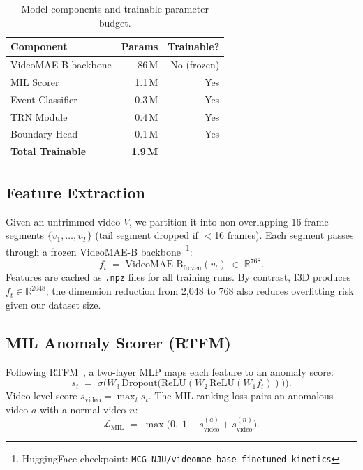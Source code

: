 \documentclass[sigconf,nonacm]{acmart}
\begin{document}
\begin{table}[t]
  \centering
  \caption{Model components and trainable parameter budget.}
  \label{tab:params}
  \small
  \begin{tabular}{lrr}
    \toprule
    \textbf{Component}      & \textbf{Params} & \textbf{Trainable?} \\
    \midrule
    VideoMAE-B backbone     & 86\,M           & No (frozen)         \\
    MIL Scorer              &  1.1\,M         & Yes                 \\
    Event Classifier        &  0.3\,M         & Yes                 \\
    TRN Module              &  0.4\,M         & Yes                 \\
    Boundary Head           &  0.1\,M         & Yes                 \\
    \midrule
    \textbf{Total Trainable} & \textbf{1.9\,M} &                   \\
    \bottomrule
  \end{tabular}
\end{table}

\subsection{Feature Extraction}

Given an untrimmed video $V$, we partition it into non-overlapping 16-frame
segments $\{v_1,\ldots,v_T\}$ (tail segment dropped if $<$16 frames).
Each segment passes through a frozen VideoMAE-B
backbone~\cite{tong2022videomae}\footnote{HuggingFace checkpoint:
\texttt{MCG-NJU/videomae-base-finetuned-kinetics}}:
\begin{equation}
  f_t \;=\; \mathrm{VideoMAE\text{-}B}_{\mathrm{frozen}}(v_t)
       \;\in\; \mathbb{R}^{768}.
\end{equation}
Features are cached as \texttt{.npz} files for all training runs.
By contrast, I3D produces $f_t\in\mathbb{R}^{2048}$; the dimension reduction
from 2{,}048 to 768 also reduces overfitting risk given our dataset size.

\subsection{MIL Anomaly Scorer (RTFM)}

Following RTFM~\cite{tian2021weakly}, a two-layer MLP maps each feature
to an anomaly score:
\begin{equation}
  s_t \;=\; \sigma\!\bigl(W_3\,
            \mathrm{Dropout}\bigl(\mathrm{ReLU}(W_2\,\mathrm{ReLU}(W_1 f_t))\bigr)
            \bigr).
\end{equation}
Video-level score $s_\mathrm{video}=\max_t s_t$.
The MIL ranking loss pairs an anomalous video $a$ with a normal video $n$:
\begin{equation}
  \mathcal{L}_\mathrm{MIL} \;=\;
    \max\!\bigl(0,\;1 - s^{(a)}_\mathrm{video} + s^{(n)}_\mathrm{video}\bigr).
\end{equation}
\end{document}
